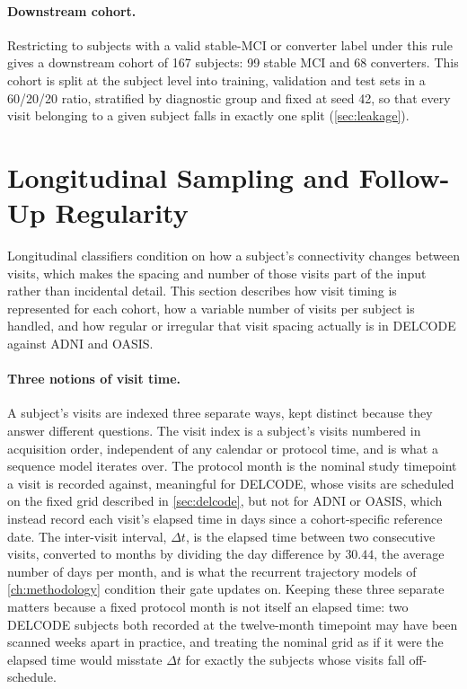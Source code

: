 \paragraph{Downstream cohort.} Restricting to subjects with a valid stable-\ac{MCI} or
converter label under this rule gives a downstream cohort of 167 subjects: 99 stable
\ac{MCI} and 68 converters. This cohort is split at the subject level into training,
validation and test sets in a 60/20/20 ratio, stratified by diagnostic group and fixed at
seed 42, so that every visit belonging to a given subject falls in exactly one split
(\autoref{sec:leakage}).

\section{Longitudinal Sampling and Follow-Up Regularity}\label{sec:sampling}

Longitudinal classifiers condition on how a subject's connectivity changes between visits,
which makes the spacing and number of those visits part of the input rather than incidental
detail. This section describes how visit timing is represented for each cohort, how a
variable number of visits per subject is handled, and how regular or irregular that visit
spacing actually is in \ac{DELCODE} against \ac{ADNI} and \ac{OASIS}.

\paragraph{Three notions of visit time.} A subject's visits are indexed three separate
ways, kept distinct because they answer different questions. The visit index is a subject's
visits numbered in acquisition order, independent of any calendar or protocol time, and is
what a sequence model iterates over. The protocol month is the nominal study timepoint a
visit is recorded against, meaningful for \ac{DELCODE}, whose visits are scheduled on the
fixed grid described in \autoref{sec:delcode}, but not for \ac{ADNI} or \ac{OASIS}, which
instead record each visit's elapsed time in days since a cohort-specific reference date.
The inter-visit interval, $\Delta t$, is the elapsed time between two consecutive visits,
converted to months by dividing the day difference by $30.44$, the average number of days
per month, and is what the recurrent trajectory models of \autoref{ch:methodology}
condition their gate updates on. Keeping these three separate matters because a fixed
protocol month is not itself an elapsed time: two \ac{DELCODE} subjects both recorded at
the twelve-month timepoint may have been scanned weeks apart in practice, and treating the
nominal grid as if it were the elapsed time would misstate $\Delta t$ for exactly the
subjects whose visits fall off-schedule.

